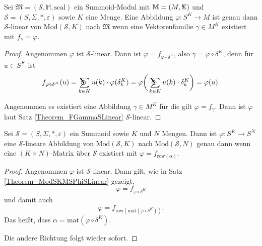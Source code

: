 \documentclass{article}
\DeclareMathOperator*{\Sigmacirc}{%
  \ThisStyle{\mathop{\ensurestackMath{\stackinset{c}{-0.75\LMpt}{c}{}{%
  \rotatebox[origin=lb]{-90}{$\circ$}}{\SavedStyle\Sigma}}}}}
\DeclareMathOperator*{\sumcirc}{%
  \ThisStyle{\mathop{\ensurestackMath{\stackinset{c}{-1.5\LMpt}{c}{}{%
  \rotatebox[origin=lb]{-90}{$\SavedStyle\scalerel*{\bm\Circle}{%
  i}$}}{\SavedStyle\sum}}}}}
\begin{document}
\begin{theorem}\label{Theorem_ModSKMSPhiSLinear}
  Sei $\mathfrak{M} = (\mathcal{S}, \mathbb{M}, \text{scal})$ ein Summoid-Modul
  mit $\mathbb{M} = (M, \Sigmacirc)$ und $\mathcal{S} = (S, \Sigma, \ast, \varepsilon)$
  sowie $K$ eine Menge.
  Eine Abbildung $\varphi \colon S^K \to M$ ist genau dann $\mathcal{S}$-linear von
  $\text{Mod}(\mathcal{S}, K)$ nach $\mathfrak{M}$ wenn eine Vektorenfamilie
  $\gamma \in M^K$ existiert mit $f_\gamma = \varphi$.
\end{theorem}
\begin{proof}
  Angenommen $\varphi$ ist $\mathcal{S}$-linear.
  Dann ist $\varphi = f_{\varphi \circ \delta^K}$, also $\gamma = \varphi \circ \delta^K$,
  denn für $u \in S^K$ ist
  \begin{equation*}
    f_{\varphi \circ \delta^K}(u)
    = \sumcirc_{k \in K} u(k) \cdot \varphi(\delta^K_k)
    = \varphi \bigg( \sumcirc_{k \in K} u(k) \cdot \delta^K_k \bigg)
    = \varphi(u).
  \end{equation*}

  Angenommen es existiert eine Abbildung $\gamma \in M^K$ für die gilt $\varphi = f_\gamma$.
  Dann ist $\varphi$ laut Satz \ref{Theorem_FGammaSLinear} $\mathcal{S}$-linear.
\end{proof}

\begin{theorem}
  Sei $\mathcal{S} = (S, \Sigma, \ast, \varepsilon)$ ein Summoid
  sowie $K$ und $N$ Mengen.
  Dann ist $\varphi \colon S^K \to S^N$ eine $\mathcal{S}$-lineare Abbildung von $\text{Mod}(\mathcal{S}, K)$
  nach $\text{Mod}(\mathcal{S}, N)$ genau dann wenn
  eine $(K \times N)$-Matrix über $\mathcal{S}$ existiert mit $\varphi = f_{\text{row}(\alpha)}$.
\end{theorem}
\begin{proof}
  Angenommen $\varphi$ ist $\mathcal{S}$-linear. 
  Dann gilt, wie in Satz \ref{Theorem_ModSKMSPhiSLinear} gezeigt,
  \begin{equation*}
    \varphi = f_{\varphi \circ \delta^K}
  \end{equation*}
  und damit auch
  \begin{equation*}
    \varphi = f_{\text{row}(\text{mat}(\varphi \circ \delta^K))}.
  \end{equation*}
  Das heißt, dass $\alpha = \text{mat}(\varphi \circ \delta^K)$.

  Die andere Richtung folgt wieder sofort.
\end{proof}
\end{document}
